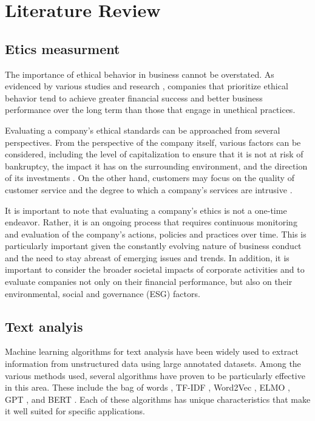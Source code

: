 \documentclass[PI]{ProjectProposal}
\begin{document}
\chapter{Literature Review}
\label{sec:org487cdf2}
\section{Etics measurment}
\label{sec:orge82890f}
The importance of ethical behavior in business cannot be overstated. As evidenced by various studies and research \autocites{climent_ethical_2018}[][]{mure_esg_2021}, companies that prioritize ethical behavior tend to achieve greater financial success and better business performance over the long term than those that engage in unethical practices.

Evaluating a company's ethical standards can be approached from several perspectives. From the perspective of the company itself, various factors can be considered, including the level of capitalization to ensure that it is not at risk of bankruptcy, the impact it has on the surrounding environment, and the direction of its investments \autocite{harvey1995ethical}. On the other hand, customers may focus on the quality of customer service \autocite{brunk2010exploring} and the degree to which a company's services are intrusive \autocite{mitchell1992bank}.

It is important to note that evaluating a company's ethics is not a one-time endeavor. Rather, it is an ongoing process that requires continuous monitoring and evaluation of the company's actions, policies and practices over time. This is particularly important given the constantly evolving nature of business conduct and the need to stay abreast of emerging issues and trends. In addition, it is important to consider the broader societal impacts of corporate activities and to evaluate companies not only on their financial performance, but also on their environmental, social and governance (ESG) factors.
\section{Text analyis}
\label{sec:org68c64ea}
Machine learning algorithms for text analysis have been widely used to extract information from unstructured data using large annotated datasets. Among the various methods used, several algorithms have proven to be particularly effective in this area. These include the bag of words \autocite{doi:10.1080/00437956.1954.11659520}, TF-IDF \autocite{jones1972statistical}, Word2Vec \autocite{mikolov2013efficient}, ELMO \autocite{elmo}, GPT \autocite{radford2019language}, and BERT \autocite{devlin2018bert}. Each of these algorithms has unique characteristics that make it well suited for specific applications.
\end{document}
